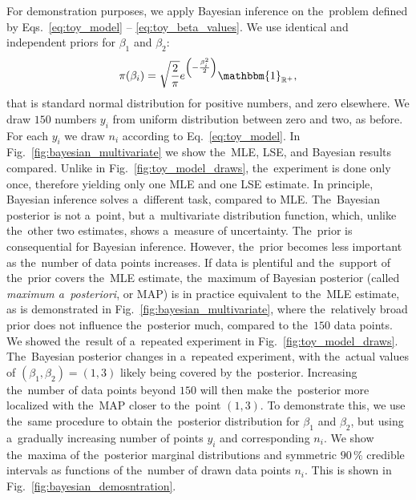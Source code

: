 For demonstration purposes, we apply Bayesian inference on the~problem defined by Eqs.~\ref{eq:toy_model} -- \ref{eq:toy_beta_values}. We use identical and independent priors for $\beta_1$ and $\beta_2$:
\begin{equation}
    \pi(\beta_i) = \sqrt{\frac{2}{\pi}} e^{\left(-\frac{\beta_i^2}{2}\right)} \mathbbm{1}_{\mathbb{R}^+} ,
\end{equation}
that is standard normal distribution for positive numbers, and zero elsewhere. We draw $150$ numbers $y_i$ from uniform distribution between zero and two, as before. For each $y_i$ we draw $n_i$ according to Eq.~\ref{eq:toy_model}. In Fig.~\ref{fig:bayesian_multivariate} we show the~MLE, LSE, and Bayesian results compared. Unlike in Fig.~\ref{fig:toy_model_draws}, the~experiment is done only once, therefore yielding only one MLE and one LSE estimate. In principle, Bayesian inference solves a~different task, compared to MLE. The~Bayesian posterior is not a~point, but a~multivariate distribution function, which, unlike the~other two estimates, shows a~measure of uncertainty. The~prior is consequential for Bayesian inference. However, the~prior becomes less important as the~number of data points increases. If data is plentiful and the~support of the~prior covers the~MLE estimate, the~maximum of Bayesian posterior (called \textit{maximum a~posteriori}, or MAP) is in practice equivalent to the~MLE estimate, as is demonstrated in Fig.~\ref{fig:bayesian_multivariate}, where the~relatively broad prior does not influence the~posterior much, compared to the~$150$ data points. We showed the~result of a~repeated experiment in Fig.~\ref{fig:toy_model_draws}. The~Bayesian posterior changes in a~repeated experiment, with the~actual values of $(\beta_1,\beta_2) = (1,3)$ likely being covered by the~posterior. Increasing the~number of data points beyond $150$ will then make the~posterior more localized with the~MAP closer to the~point $(1,3)$. To demonstrate this, we use the~same procedure to obtain the~posterior distribution for $\beta_1$ and $\beta_2$, but using a~gradually increasing number of points $y_i$ and corresponding $n_i$. We show the~maxima of the~posterior marginal distributions and symmetric $90 \, \%$ credible intervals as functions of the~number of drawn data points $n_i$. This is shown in Fig.~\ref{fig:bayesian_demosntration}.

